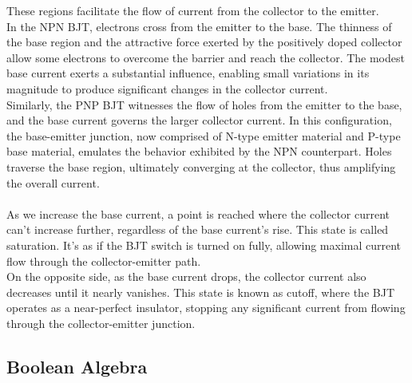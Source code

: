         These regions facilitate the flow of current from the collector to the emitter. \\
        In the NPN BJT, electrons cross from the emitter to the base. 
        The thinness of the base region and the attractive force exerted by the positively doped collector allow some electrons to overcome the barrier and reach the collector. 
        The modest base current exerts a substantial influence, enabling small variations in its magnitude to produce significant changes in the collector current. \\
        Similarly, the PNP BJT witnesses the flow of holes from the emitter to the base, and the base current governs the larger collector current. 
        In this configuration, the base-emitter junction, now comprised of N-type emitter material and P-type base material, emulates the behavior exhibited by the NPN counterpart. 
        Holes traverse the base region, ultimately converging at the collector, thus amplifying the overall current. \\\\
        As we increase the base current, a point is reached where the collector current can't increase further, regardless of the base current's rise. 
        This state is called saturation. It's as if the BJT switch is turned on fully, allowing maximal current flow through the collector-emitter path. \\
        On the opposite side, as the base current drops, the collector current also decreases until it nearly vanishes. 
        This state is known as cutoff, where the BJT operates as a near-perfect insulator, stopping any significant current from flowing through the collector-emitter junction.
        
    \subsection{Boolean Algebra}        
    